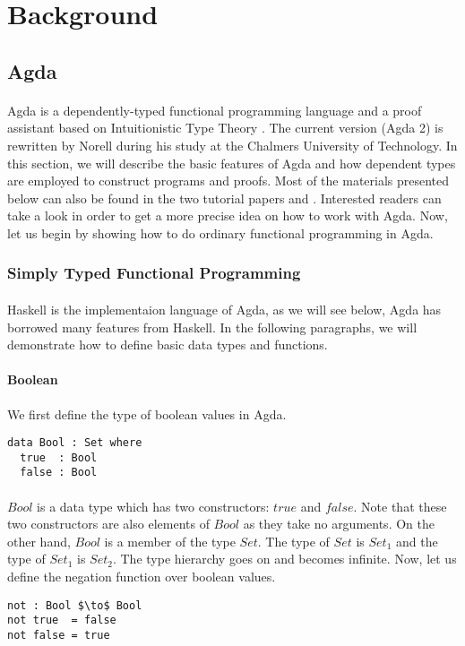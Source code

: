 \section{Background}

\subsection{Agda} 
\paragraph{} Agda is a dependently-typed functional programming language and a
proof assistant based on Intuitionistic Type Theory
\cite{martin1984}. The current version (Agda 2) is rewritten by Norell
\cite{norell2007} during his study at the Chalmers University of
Technology. In this section, we will describe the basic features of
Agda and how dependent types are employed to construct programs and
proofs. Most of the materials presented below can also be
found in the two tutorial papers \cite{bove2009} and
\cite{norell2009}. Interested readers can take a look in order to get
a more precise idea on how to work with Agda. Now, let us begin by
showing how to do ordinary functional programming in Agda. 


\subsubsection{Simply Typed Functional Programming}
\paragraph{} Haskell is the implementaion language
of Agda, as we will see below, Agda has borrowed many features from
Haskell. In the following paragraphs, we will demonstrate how to
define basic data types and functions. 

\paragraph{Boolean} We first define the type of boolean values in Agda.  
\begin{lstlisting}[mathescape=true,xleftmargin=.3\textwidth]
data Bool : Set where
  true  : Bool
  false : Bool
\end{lstlisting}

\paragraph{} \(Bool\) is a data type which has two
constructors: \(true\) and \(false\). Note that these two constructors
are also elements of \(Bool\) as they take no arguments. On
the other hand, \(Bool\) is a member of the type
\(Set\). The type of \(Set\) is \(Set_1\) and the type of \(Set_1\) is
\(Set_2\). The type hierarchy goes on and becomes infinite. Now, let
us define the negation function over boolean values. 
\begin{lstlisting}[mathescape=true,xleftmargin=.3\textwidth]
not : Bool $\to$ Bool
not true  = false
not false = true
\end{lstlisting}

